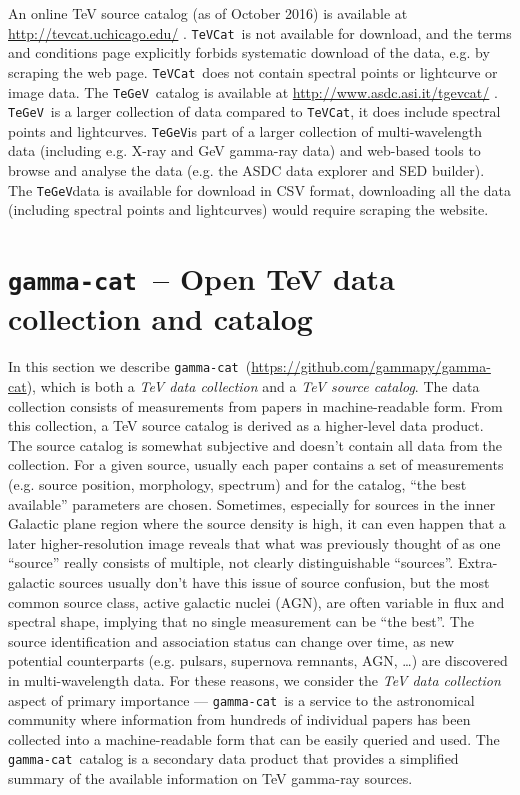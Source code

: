 \documentclass[11pt,twoside]{article}
\newcommand{\gammacat}{\texttt{gamma-cat}}
\newcommand{\tevcat}{\texttt{TeVCat}}
\newcommand{\tegev}{\texttt{TeGeV}}
\begin{document}
An online TeV source catalog (as of October 2016) is available at \url{http://tevcat.uchicago.edu/} \citep{tevcat}. \tevcat\ is not available for download, and the terms and conditions page explicitly forbids systematic download of the data, e.g. by scraping the web page. \tevcat\ does not contain spectral points or lightcurve or image data.
The \tegev\ catalog is available at \url{http://www.asdc.asi.it/tgevcat/} \citet{tgevcat}. \tegev\ is a larger collection of data compared to \tevcat, it does include spectral points and lightcurves. \tegev is part of a larger collection of multi-wavelength data (including e.g. X-ray and GeV gamma-ray data) and web-based tools to browse and analyse the data (e.g. the ASDC data explorer and SED builder). The \tegev data is available for download in CSV format, downloading all the data (including spectral points and lightcurves) would require scraping the website. 



\section{\gammacat\ -- Open TeV data collection and catalog}

In this section we describe \gammacat\
(\url{https://github.com/gammapy/gamma-cat}), which is both a \emph{TeV data
collection} and a \emph{TeV source catalog}. The data collection consists of
measurements from papers in machine-readable form. From this collection, a TeV
source catalog is derived as a higher-level data product. The source catalog is
somewhat subjective and doesn't contain all data from the collection. For a
given source, usually each paper contains a set of measurements (e.g. source
position, morphology, spectrum) and for the catalog, ``the best available''
parameters are chosen. Sometimes, especially for sources in the inner Galactic
plane region where the source density is high, it can even happen that a later
higher-resolution image reveals that what was previously thought of as one
``source'' really consists of multiple, not clearly distinguishable ``sources''.
Extra-galactic sources usually don't have this issue of source confusion, but
the most common source class, active galactic nuclei (AGN), are often variable
in flux and spectral shape, implying that no single measurement can be ``the
best''. The source identification and association status can change over time,
as new potential counterparts (e.g. pulsars, supernova remnants, AGN, \ldots)
are discovered in multi-wavelength data. For these reasons, we consider the \emph{TeV data collection} aspect of primary importance --- \gammacat\ is a service to the astronomical community where information from hundreds of individual papers has been collected into a machine-readable form that can be easily queried and used. The \gammacat\ catalog is a secondary data product that provides a simplified summary of the available information on TeV gamma-ray sources.
\end{document}
